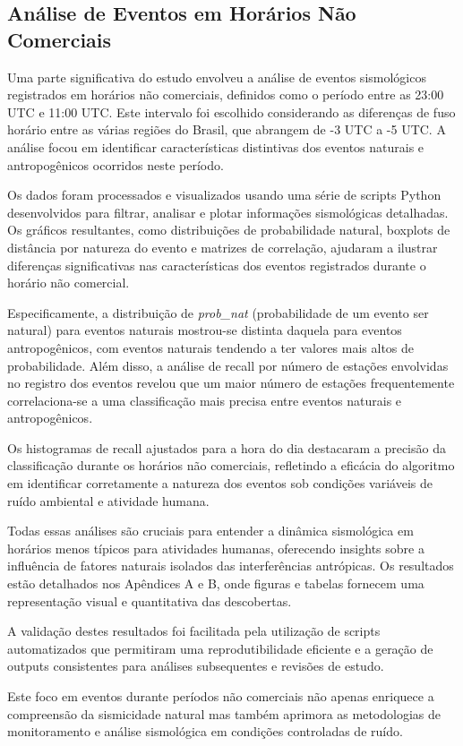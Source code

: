 \subsection{Análise de Eventos em Horários Não Comerciais}
\label{subsec:nao_comerciais}

%

\par{Uma parte significativa do estudo envolveu a análise de eventos sismológicos registrados em horários não comerciais, definidos como o período entre as 23:00 UTC e 11:00 UTC. Este intervalo foi escolhido considerando as diferenças de fuso horário entre as várias regiões do Brasil, que abrangem de -3 UTC a -5 UTC. A análise focou em identificar características distintivas dos eventos naturais e antropogênicos ocorridos neste período.}

\par{Os dados foram processados e visualizados usando uma série de scripts Python desenvolvidos para filtrar, analisar e plotar informações sismológicas detalhadas. Os gráficos resultantes, como distribuições de probabilidade natural, boxplots de distância por natureza do evento e matrizes de correlação, ajudaram a ilustrar diferenças significativas nas características dos eventos registrados durante o horário não comercial.}

\par{Especificamente, a distribuição de \textit{prob\_nat} (probabilidade de um evento ser natural) para eventos naturais mostrou-se distinta daquela para eventos antropogênicos, com eventos naturais tendendo a ter valores mais altos de probabilidade. Além disso, a análise de recall por número de estações envolvidas no registro dos eventos revelou que um maior número de estações frequentemente correlaciona-se a uma classificação mais precisa entre eventos naturais e antropogênicos.}

\par{Os histogramas de recall ajustados para a hora do dia destacaram a precisão da classificação durante os horários não comerciais, refletindo a eficácia do algoritmo em identificar corretamente a natureza dos eventos sob condições variáveis de ruído ambiental e atividade humana.}

\par{Todas essas análises são cruciais para entender a dinâmica sismológica em horários menos típicos para atividades humanas, oferecendo insights sobre a influência de fatores naturais isolados das interferências antrópicas. Os resultados estão detalhados nos Apêndices A e B, onde figuras e tabelas fornecem uma representação visual e quantitativa das descobertas.}

\par{A validação destes resultados foi facilitada pela utilização de scripts automatizados que permitiram uma reprodutibilidade eficiente e a geração de outputs consistentes para análises subsequentes e revisões de estudo.}

\par{Este foco em eventos durante períodos não comerciais não apenas enriquece a compreensão da sismicidade natural mas também aprimora as metodologias de monitoramento e análise sismológica em condições controladas de ruído.}
